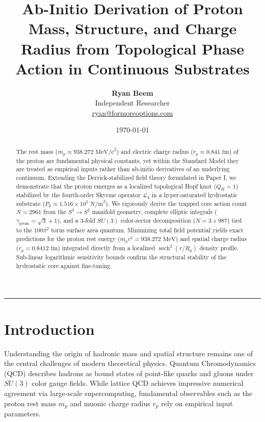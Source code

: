 \documentclass[11pt,a4paper]{article}
\title{\Large\bfseries Ab-Initio Derivation of Proton Mass, Structure, and Charge Radius from Topological Phase Action in Continuous Substrates}
\author{
	\textbf{Ryan Beem}\\[0.5em]
	\small Independent Researcher \\
	\small \href{mailto:ryan@formoreoptions.com}{ryan@formoreoptions.com}
}
\date{\today}
\begin{document}
	
	\maketitle
	
	\begin{abstract}
		The rest mass ($m_p \approx 938.272 \text{ MeV/c}^2$) and electric charge radius ($r_p \approx 0.841 \text{ fm}$) of the proton are fundamental physical constants, yet within the Standard Model they are treated as empirical inputs rather than ab-initio derivatives of an underlying continuum. Extending the Derrick-stabilized field theory formulated in Paper I, we demonstrate that the proton emerges as a localized topological Hopf knot ($Q_H = 1$) stabilized by the fourth-order Skyrme operator $\mathcal{L}_4$ in a hyper-saturated hydrostatic substrate ($P_0 \approx 1.516 \times 10^5 \text{ N/m}^2$). We rigorously derive the trapped core action count $N = 2961$ from the $S^3 \to S^2$ manifold geometry, complete elliptic integrals ($\gamma_{\text{geom}} = \sqrt{3} + 1$), and a 3-fold $SU(3)$ color-sector decomposition ($N = 3 \times 987$) tied to the $100\pi^2$ torus surface area quantum. Minimizing total field potential yields exact predictions for the proton rest energy ($m_p c^2 = 938.272 \text{ MeV}$) and spatial charge radius ($r_p = 0.8412 \text{ fm}$) integrated directly from a localized $\operatorname{sech}^2(r/R_p)$ density profile. Sub-linear logarithmic sensitivity bounds confirm the structural stability of the hydrostatic core against fine-tuning.
	\end{abstract}
	
	\vspace{1em}
	\hrule
	\vspace{1.5em}
	
	\section{Introduction}
	\label{sec:intro}
	
	Understanding the origin of hadronic mass and spatial structure remains one of the central challenges of modern theoretical physics. Quantum Chromodynamics (QCD) describes hadrons as bound states of point-like quarks and gluons under $SU(3)$ color gauge fields. While lattice QCD achieves impressive numerical agreement via large-scale supercomputing, fundamental observables such as the proton rest mass $m_p$ and muonic charge radius $r_p$ rely on empirical input parameters.
	
\end{document}
